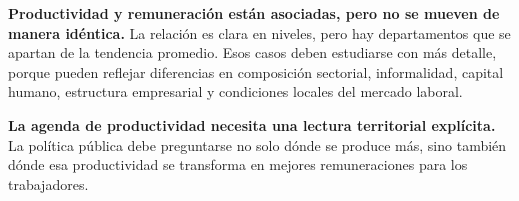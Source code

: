 \textbf{Productividad y remuneración están asociadas, pero no se mueven de manera idéntica.} La relación es clara en niveles, pero hay departamentos que se apartan de la tendencia promedio. Esos casos deben estudiarse con más detalle, porque pueden reflejar diferencias en composición sectorial, informalidad, capital humano, estructura empresarial y condiciones locales del mercado laboral.

\textbf{La agenda de productividad necesita una lectura territorial explícita.} La política pública debe preguntarse no solo dónde se produce más, sino también dónde esa productividad se transforma en mejores remuneraciones para los trabajadores.